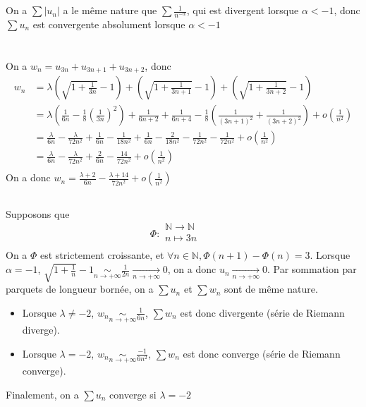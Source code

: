 \documentclass[a4paper,12pt]{book}
\begin{document}
\section{}
On a $\sum |u_n|$ a le même nature que $\sum \frac{1}{n^{-\alpha}}$, qui est divergent lorsque
$\alpha < -1$, donc $\sum u_n$ est convergente absolument lorsque $\boxed{\alpha < -1}$
\section{}
\subsection{}
On a $w_n=u_{3n}+u_{3n+1}+u_{3n+2}$, donc
\begin{align*}
w_n&=\lambda\left(\sqrt{1+\frac{1}{3n}}-1\right)+\left(\sqrt{1+\frac{1}{3n+1}}-1\right)+\left(\sqrt{1+\frac{1}{3n+2}}-1\right)\\
   &=\lambda\left(\frac{1}{6n}-\frac{1}{8}\left(\frac{1}{3n}\right)^2\right)+
   \frac{1}{6n+2}+\frac{1}{6n+4}-\frac{1}{8}\left(\frac{1}{(3n+1)^2}+\frac{1}{(3n+2)^2}\right)+o\left(\frac{1}{n^2}\right)\\
   &=\frac{\lambda}{6n}-\frac{\lambda}{72n^2}+\frac{1}{6n}-\frac{1}{18n^2}+\frac{1}{6n}-\frac{2}{18n^2}-\frac{1}{72n^2}-\frac{1}{72n^2}
   +o\left(\frac{1}{n^2}\right)\\
   &=\frac{\lambda}{6n}-\frac{\lambda}{72n^2}+\frac{2}{6n}-\frac{14}{72n^2}+o\left(\frac{1}{n^2}\right)\\
\end{align*}
On a donc $\boxed{w_n=\frac{\lambda+2}{6n}-\frac{\lambda+14}{72n^2}+o\left(\frac{1}{n^2}\right)}$
\subsection{}
Supposons que 
\begin{equation}  \nonumber
    \Phi:\left.  
                 \begin{array}{rcl}  
                  \mathbb{N} \to \mathbb{N} & & \\
                  n \mapsto 3n & & \\
                 \end{array}  
    \right.  
    \end{equation} 
On a $\Phi$ est strictement croissante, et $\forall n \in \mathbb{N}, \Phi(n+1)-\Phi(n)=3$. 
Lorsque $\alpha=-1$, $\sqrt{1+\frac{1}{n}}-1\mathop{\sim}\limits_{n \to +\infty}\frac{1}{2n}\mathop{\rightarrow}\limits_{n \to +\infty}0$, 
on a donc $u_n\mathop{\rightarrow}\limits_{n \to +\infty}0$. Par sommation par parquets de longueur bornée, on a $\sum u_n$ et $\sum w_n$ sont de même nature. 
\begin{itemize}
    \item Lorsque $\lambda \neq -2$, $w_n\mathop{\sim}\limits_{n \to +\infty} \frac{1}{6n}$, $\sum w_n$ est donc divergente (série de Riemann diverge). 
    \item Lorsque $\lambda =-2$, $w_n\mathop{\sim}\limits_{n \to +\infty} \frac{-1}{6n^2}$, $\sum w_n$ est donc converge (série de Riemann converge).
\end{itemize}
Finalement, on a $\sum u_n$ converge si $\boxed{\lambda=-2}$
\end{document}

